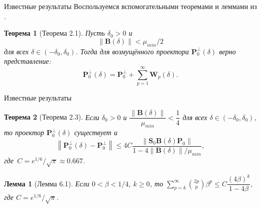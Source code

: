 \documentclass[notheorems, handout]{beamer}
\newtheorem{theorem}{Теорема}
\newtheorem{lemma}{Лемма}
\newcommand{\norm}[1]{\left\|#1\right\|}
\begin{document}
	\begin{frame}{Известные результаты}
		Воспользуемся вспомогательными теоремами и леммами из \cite{Nekrutkin10}.
		\begin{theorem}[Теорема 2.1]\label{th:2.1}
			Пусть $\delta_0>0$ и
			\begin{equation*}
				\norm{\mathbf{B}(\delta)}<\mu_{min}/2
			\end{equation*}
			для всех $\delta\in(-\delta_0,\delta_0)$. Тогда для возмущённого проектора $\mathbf{P}_0^\bot(\delta)$ верно представление:
			\begin{equation*}
				\mathbf{P}_0^\bot(\delta)=\mathbf{P}_0^\bot + \sum_{p=1}^\infty\mathbf{W}_p(\delta).
			\end{equation*}
		\end{theorem}%
	\end{frame}
	\begin{frame}{Известные результаты}
		\begin{theorem}[Теорема 2.3]
			\label{th:2.3}
			Если $\delta_0 > 0$ и $\dfrac{\norm{\mathbf{B}(\delta)}}{\mu_{min}} < \dfrac{1}{4}$ для всех $\delta \in (-\delta_0, \delta_0)$, то проектор $\mathbf{P}^\bot_0(\delta)$ существует и \begin{equation*}\norm{\mathbf{P}_0^\bot(\delta) - \mathbf{P}_0^\bot} \leqslant 4C\dfrac{\norm{\mathbf{S}_0\mathbf{B}(\delta)\mathbf{P}_0}}{1 - 4\norm{\mathbf{B}(\delta)}/\mu_{min}},
			\end{equation*}
			где $\,C = e^{1/6}/\sqrt{\pi}\approx0.667$.
		\end{theorem}%
		\begin{lemma}[Лемма 6.1]
			\label{lem:6.1}
			Если $0<\beta<{1}/{4}$, $k \geqslant 0$, то
			$\sum^\infty_{p=k}{2p \choose p}\beta^p \leqslant C\dfrac{(4\beta)^k}{1-4\beta},$ где $C = e^{1/6}/\sqrt{\pi}$.
		\end{lemma}%
	\end{frame}
\end{document}
